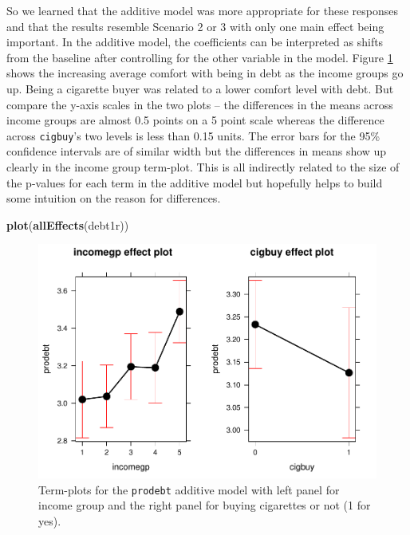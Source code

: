 \documentclass[]{book}
\newenvironment{Shaded}{\begin{snugshade}}{\end{snugshade}}
\newcommand{\KeywordTok}[1]{\textcolor[rgb]{0.13,0.29,0.53}{\textbf{#1}}}
\newcommand{\NormalTok}[1]{#1}
\theoremstyle{definition}
\theoremstyle{definition}
\theoremstyle{remark}
\begin{document}
So we learned that the additive model was more appropriate for these
responses and that the results resemble Scenario 2 or 3 with only one
main effect being important. In the additive model, the coefficients can
be interpreted as shifts from the baseline after controlling for the
other variable in the model. Figure \ref{fig:Figure4-15} shows the
increasing average comfort with being in debt as the income groups go
up. Being a cigarette buyer was related to a lower comfort level with
debt. But compare the y-axis scales in the two plots -- the differences
in the means across income groups are almost 0.5 points on a 5 point
scale whereas the difference across \texttt{cigbuy}'s two levels is less
than 0.15 units. The error bars for the 95\% confidence intervals are of
similar width but the differences in means show up clearly in the income
group term-plot. This is all indirectly related to the size of the
p-values for each term in the additive model but hopefully helps to
build some intuition on the reason for differences.





\begin{Shaded}
\begin{Highlighting}[]
\KeywordTok{plot}\NormalTok{(}\KeywordTok{allEffects}\NormalTok{(debt1r))}
\end{Highlighting}
\end{Shaded}

\begin{figure}
\centering
\includegraphics{04-twoWayAnova_files/figure-latex/Figure4-15-1.pdf}
\caption{\label{fig:Figure4-15}Term-plots for the \texttt{prodebt} additive model with
left panel for income group and the right panel for buying cigarettes or
not (1 for yes).}
\end{figure}
\end{document}
